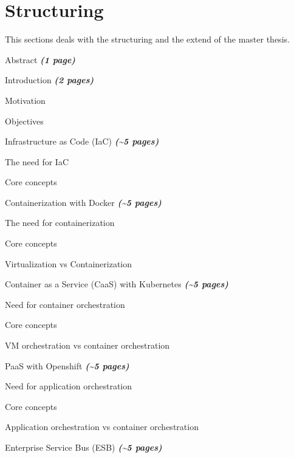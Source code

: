 \section{Structuring}
\label{sec:thesis-structuring}
This sections deals with the structuring and the extend of the master thesis.
\begin{numbered}
	\item Abstract \textbf{\textit{(1 page)}}
	\item Introduction \textbf{\textit{(2 pages)}}
	\begin{numbered}
		\item Motivation
		\item Objectives
	\end{numbered}
	\item Infrastructure as Code (IaC) \textbf{\textit{(\textasciitilde 5 pages)}}
	\begin{numbered}
		\item The need for IaC
		\item Core concepts
	\end{numbered}
	\item Containerization with Docker \textbf{\textit{(\textasciitilde 5 pages)}}
	\begin{numbered}
		\item The need for containerization
		\item Core concepts
		\item Virtualization vs Containerization
	\end{numbered}
	\item Container as a Service (CaaS) with Kubernetes \textbf{\textit{(\textasciitilde 5 pages)}}
	\begin{numbered}
		\item Need for container orchestration
		\item Core concepts
		\item VM orchestration vs container orchestration
	\end{numbered}
	\item PaaS with Openshift \textbf{\textit{(\textasciitilde 5 pages)}}
	\begin{numbered}
		\item Need for application orchestration
		\item Core concepts
		\item Application orchestration vs container orchestration
	\end{numbered}
	\item Enterprise Service Bus (ESB) \textbf{\textit{(\textasciitilde 5 pages)}}

\end{numbered}
